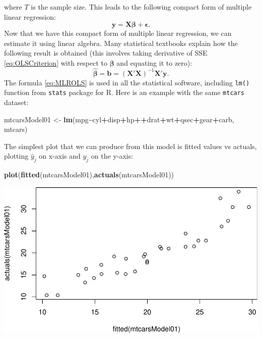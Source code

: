 \documentclass[
]{book}
\newenvironment{Shaded}{\begin{snugshade}}{\end{snugshade}}
\newcommand{\KeywordTok}[1]{\textcolor[rgb]{0.13,0.29,0.53}{\textbf{#1}}}
\newcommand{\NormalTok}[1]{#1}
\newcommand{\OperatorTok}[1]{\textcolor[rgb]{0.81,0.36,0.00}{\textbf{#1}}}
\newcommand{\StringTok}[1]{\textcolor[rgb]{0.31,0.60,0.02}{#1}}
\theoremstyle{definition}
\theoremstyle{definition}
\theoremstyle{definition}
\theoremstyle{definition}
\theoremstyle{remark}
\begin{document}
where \(T\) is the sample size. This leads to the following compact form of multiple linear regression:
\begin{equation}
    \mathbf{y} = \mathbf{X} \boldsymbol{\beta} + \boldsymbol{\epsilon} .
    \label{eq:MLRFormulaCompactest}
\end{equation}
Now that we have this compact form of multiple linear regression, we can estimate it using linear algebra. Many statistical textbooks explain how the following result is obtained (this involves taking derivative of SSE \eqref{eq:OLSCriterion} with respect to \(\boldsymbol{\beta}\) and equating it to zero):
\begin{equation}
    \hat{\boldsymbol{\beta}} = \mathbf{b} = \left(\mathbf{X}' \mathbf{X}\right)^{-1} \mathbf{X}' \mathbf{y} .
    \label{eq:MLROLS}
\end{equation}
The formula \eqref{eq:MLROLS} is used in all the statistical software, including \texttt{lm()} function from \texttt{stats} package for R. Here is an example with the same \texttt{mtcars} dataset:

\begin{Shaded}
\begin{Highlighting}[]
\NormalTok{mtcarsModel01 \textless{}{-}}\StringTok{ }\KeywordTok{lm}\NormalTok{(mpg}\OperatorTok{\textasciitilde{}}\NormalTok{cyl}\OperatorTok{+}\NormalTok{disp}\OperatorTok{+}\NormalTok{hp}\OperatorTok{++}\NormalTok{drat}\OperatorTok{+}\NormalTok{wt}\OperatorTok{+}\NormalTok{qsec}\OperatorTok{+}\NormalTok{gear}\OperatorTok{+}\NormalTok{carb, mtcars)}
\end{Highlighting}
\end{Shaded}

The simplest plot that we can produce from this model is fitted values vs actuals, plotting \(\hat{y}_j\) on x-axis and \(y_j\) on the y-axis:

\begin{Shaded}
\begin{Highlighting}[]
\KeywordTok{plot}\NormalTok{(}\KeywordTok{fitted}\NormalTok{(mtcarsModel01),}\KeywordTok{actuals}\NormalTok{(mtcarsModel01))}
\end{Highlighting}
\end{Shaded}

\includegraphics{Svetunkov---Statistics-for-Business-Analytics_files/figure-latex/unnamed-chunk-62-1.pdf}
\end{document}

